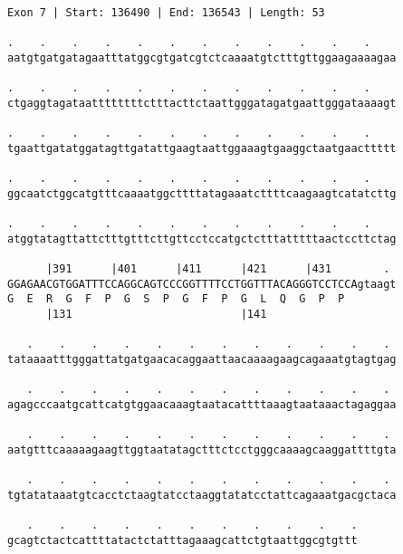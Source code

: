 \documentclass{article}
\begin{document}
\newpage
\begin{Verbatim}[fontfamily=courier]
Exon 7 | Start: 136490 | End: 136543 | Length: 53

.    .    .    .    .    .    .    .    .    .    .    .    
aatgtgatgatagaatttatggcgtgatcgtctcaaaatgtctttgttggaagaaaagaa

.    .    .    .    .    .    .    .    .    .    .    .    
ctgaggtagataattttttttctttacttctaattgggatagatgaattgggataaaagt

.    .    .    .    .    .    .    .    .    .    .    .    
tgaattgatatggatagttgatattgaagtaattggaaagtgaaggctaatgaacttttt

.    .    .    .    .    .    .    .    .    .    .    .    
ggcaatctggcatgtttcaaaatggcttttatagaaatcttttcaagaagtcatatcttg

.    .    .    .    .    .    .    .    .    .    .    .    
atggtatagttattctttgtttcttgttcctccatgctctttatttttaactccttctag

      |391      |401      |411      |421      |431        . 
GGAGAACGTGGATTTCCAGGCAGTCCCGGTTTTCCTGGTTTACAGGGTCCTCCAgtaagt
G  E  R  G  F  P  G  S  P  G  F  P  G  L  Q  G  P  P        
      |131                          |141                    

   .    .    .    .    .    .    .    .    .    .    .    . 
tataaaatttgggattatgatgaacacaggaattaacaaaagaagcagaaatgtagtgag

   .    .    .    .    .    .    .    .    .    .    .    . 
agagcccaatgcattcatgtggaacaaagtaatacattttaaagtaataaactagaggaa

   .    .    .    .    .    .    .    .    .    .    .    . 
aatgtttcaaaaagaagttggtaatatagctttctcctgggcaaaagcaaggattttgta

   .    .    .    .    .    .    .    .    .    .    .    . 
tgtatataaatgtcacctctaagtatcctaaggtatatcctattcagaaatgacgctaca

   .    .    .    .    .    .    .    .    .    .    .
gcagtctactcattttatactctatttagaaagcattctgtaattggcgtgttt
\end{Verbatim}
\newpage
\end{document}
